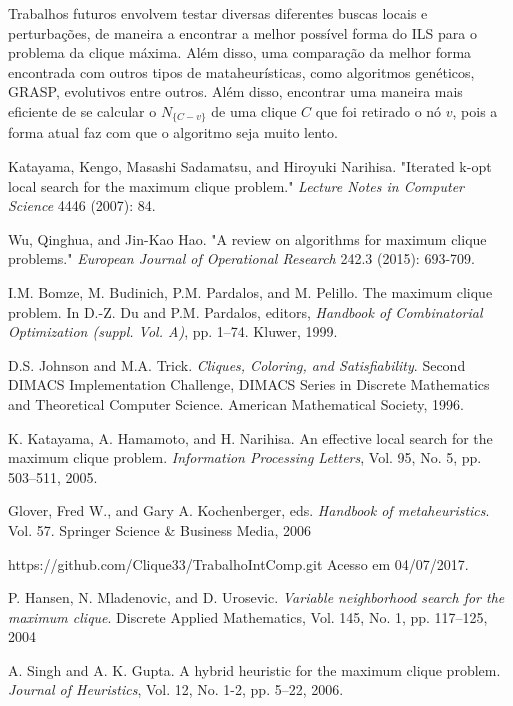 \documentclass{article}
\begin{document}
Trabalhos futuros envolvem testar diversas diferentes buscas locais e perturbações, de maneira a encontrar a melhor possível forma do ILS para o problema da clique máxima. Além disso, uma comparação da melhor forma encontrada com outros tipos de mataheurísticas, como algoritmos genéticos, GRASP, evolutivos entre outros. Além disso, encontrar uma maneira mais eficiente de se calcular o $N_{\{C-v\}}$ de uma clique $C$ que foi retirado o nó $v$, pois a forma atual faz com que o algoritmo seja muito lento.

\begin{thebibliography}{58}

  Katayama, Kengo, Masashi Sadamatsu, and Hiroyuki Narihisa. 
"Iterated k-opt local search for the maximum clique problem." 
\textit{Lecture Notes in Computer Science} 4446 (2007): 84.

Wu, Qinghua, and Jin-Kao Hao. 
"A review on algorithms for maximum clique problems." 
\textit{European Journal of Operational Research} 242.3 (2015): 693-709.

I.M. Bomze, M. Budinich, P.M. Pardalos, and M. Pelillo. The maximum clique
problem. In D.-Z. Du and P.M. Pardalos, editors, \textit{Handbook of Combinatorial
Optimization (suppl. Vol. A)}, pp. 1–74. Kluwer, 1999.

D.S. Johnson and M.A. Trick. \textit{Cliques, Coloring, and Satisfiability}. Second DIMACS
Implementation Challenge, DIMACS Series in Discrete Mathematics and
Theoretical Computer Science. American Mathematical Society, 1996.

 K. Katayama, A. Hamamoto, and H. Narihisa. An effective local search for the
maximum clique problem. \textit{Information Processing Letters}, Vol. 95, No. 5, pp.
503–511, 2005.

Glover, Fred W., and Gary A. Kochenberger, eds. \textit{Handbook of metaheuristics}. Vol. 57. Springer Science \& Business Media, 2006

https://github.com/Clique33/TrabalhoIntComp.git Acesso em 04/07/2017.

P. Hansen, N. Mladenovic, and D. Urosevic. \textit{Variable neighborhood search for
the maximum clique}. Discrete Applied Mathematics, Vol. 145, No. 1, pp. 117–125,
2004

A. Singh and A. K. Gupta. A hybrid heuristic for the maximum clique problem.
\textit{Journal of Heuristics}, Vol. 12, No. 1-2, pp. 5–22, 2006.

\end{thebibliography}
\end{document}
